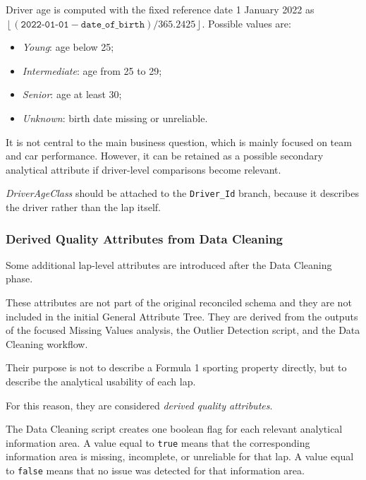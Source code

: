 \documentclass[a4paper,11pt]{article}
\begin{document}
	
	Driver age is computed with the fixed reference date 1 January 2022 as
	$\left\lfloor(\texttt{2022-01-01}-\texttt{date\_of\_birth})/365.2425\right\rfloor$.
	Possible values are:
	
	\begin{itemize}
		\item \textit{Young}: age below 25;
		\item \textit{Intermediate}: age from 25 to 29;
		\item \textit{Senior}: age at least 30;
		\item \textit{Unknown}: birth date missing or unreliable.
	\end{itemize}

	It is not central to the main business question, which is mainly focused on team and car
	performance. However, it can be retained as a possible secondary analytical attribute if
	driver-level comparisons become relevant.
	
	\textit{DriverAgeClass} should be attached to the \texttt{Driver\_Id} branch,
	because it describes the driver rather than the lap itself.
	
	\subsubsection{Derived Quality Attributes from Data Cleaning}
	
	Some additional lap-level attributes are introduced after the Data Cleaning phase.
	
	These attributes are not part of the original reconciled schema and they are not included in
	the initial General Attribute Tree. They are derived from the outputs of the focused
	Missing Values analysis, the Outlier Detection script, and the Data Cleaning workflow.
	
	Their purpose is not to describe a Formula 1 sporting property directly, but to describe the
	analytical usability of each lap.
	
	For this reason, they are considered \textit{derived quality attributes}.
	
	The Data Cleaning script creates one boolean flag for each relevant analytical information
	area. A value equal to \texttt{true} means that the corresponding information area is missing,
	incomplete, or unreliable for that lap. A value equal to \texttt{false} means that no issue was
	detected for that information area.
	
\end{document}

